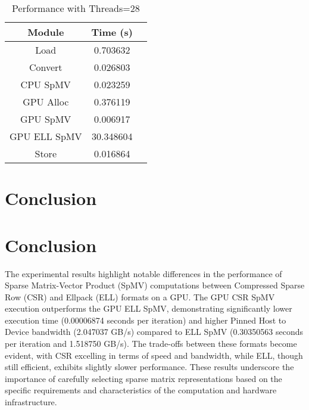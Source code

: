 \documentclass[11pt, twocolumn]{article}
\begin{document}
\begin{table}[H]
    \centering
    \begin{tabular}{|c|c|c|}
    \hline
    Module & Time (s)  \\
    \hline
    Load & 0.703632  \\
    Convert & 0.026803  \\
    CPU SpMV & 0.023259  \\
    GPU Alloc & 0.376119  \\
    GPU SpMV & 0.006917  \\
    GPU ELL SpMV & 30.348604  \\
    Store & 0.016864 \\
    
    \hline
    \end{tabular}
    \caption{Performance with Threads=28}
\end{table}

\section{Conclusion}


\section{Conclusion}

The experimental results highlight notable differences in the performance of Sparse Matrix-Vector Product (SpMV) computations between Compressed Sparse Row (CSR) and Ellpack (ELL) formats on a GPU. The GPU CSR SpMV execution outperforms the GPU ELL SpMV, demonstrating significantly lower execution time (0.00006874 seconds per iteration) and higher Pinned Host to Device bandwidth (2.047037 GB/s) compared to ELL SpMV (0.30350563 seconds per iteration and 1.518750 GB/s). The trade-offs between these formats become evident, with CSR excelling in terms of speed and bandwidth, while ELL, though still efficient, exhibits slightly slower performance. These results underscore the importance of carefully selecting sparse matrix representations based on the specific requirements and characteristics of the computation and hardware infrastructure.
\end{document}
